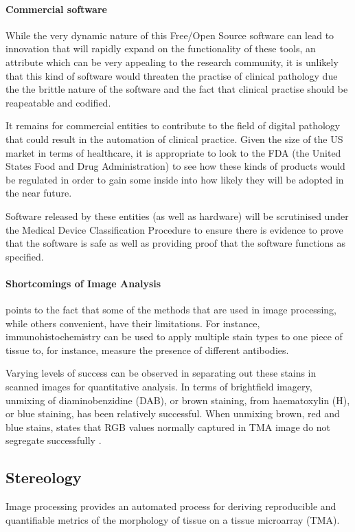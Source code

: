 \documentclass[12pt]{article}
\begin{document}
\paragraph{Commercial software}
While the very dynamic nature of this Free/Open Source software can lead to innovation that will rapidly expand on the 
functionality of these tools, an attribute which can be very appealing to the research community, it is unlikely that
this kind of software would threaten the practise of clinical pathology due the the brittle nature of the software and
the fact that clinical practise should be reapeatable and codified.

It remains for commercial entities to contribute to the field of digital pathology that could result in the automation of
clinical practice. Given the size of the US market in terms of healthcare, it is appropriate to look to the FDA (the
United States Food and Drug Administration) to see how these kinds of products would be regulated in order to gain some
inside into how likely they will be adopted in the near future.

Software released by these entities (as well as hardware) will be scrutinised under the Medical Device Classification
Procedure \parencite{fdadevices} to ensure there is evidence to prove that the software is safe as well as providing
proof that the software functions as specified.

\paragraph{Shortcomings of Image Analysis}
\citeauthor{taylor2006quantification} points to the fact that some of the methods that are used in image processing, 
while others convenient, have their limitations. For instance, immunohistochemistry can be used to apply multiple 
stain types to one piece of tissue to, for instance, measure the presence of different antibodies.

Varying levels of success can be observed in separating out these stains in scanned images for quantitative analysis. 
In terms of brightfield imagery, unmixing of diaminobenzidine (DAB), or brown staining, from haematoxylin (H), or blue 
staining, has been relatively successful. When unmixing brown, red and blue stains, 
\citeauthor{taylor2006quantification} states that RGB values normally captured in TMA image do not segregate 
successfully \parencite{taylor2006quantification}.


\subsection{Stereology}
Image processing provides an automated process for deriving reproducible and quantifiable metrics of the 
morphology of tissue on a tissue microarray (TMA).
\end{document}
